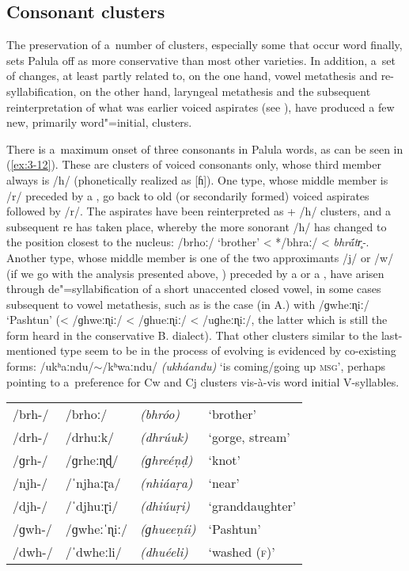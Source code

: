 \subsection{Consonant clusters}
\label{subsec:3-3-2}


The preservation of a~number of clusters, especially some that occur word finally, sets Palula off as more conservative than most other  varieties. In addition, a~set of changes, at least partly related to, on the one hand, vowel metathesis and re-syllabification, on the other hand, laryngeal metathesis and the subsequent reinterpretation of what was earlier voiced aspirates (see ), have produced a few new, primarily word"=initial, clusters.


There is a~maximum onset of three consonants in Palula words, as can be seen in (\ref{ex:3-12}). These are clusters of voiced consonants only, whose third member always is /h/ (phonetically realized as [ɦ]).  One type, whose middle member is /r/ preceded by a , go back to old (or secondarily formed) voiced aspirates followed by /r/. The aspirates have been reinterpreted as  + /h/ clusters, and a subsequent re has taken place, whereby the more sonorant /h/ has changed to the position closest to the  nucleus: /brhoː/ `brother' < */bhraː/ < \textit{bhr\'{\={a}}tr̥-}. Another type, whose middle member is one of the two approximants /j/ or /w/ (if we go with the analysis presented above, ) preceded by a  or a , have arisen through de"=syllabification of a short unaccented closed vowel, in some cases subsequent to vowel metathesis, such as is the case (in A.) with /ɡwheːɳiː/ `Pashtun' (< /ɡhweːɳiː/ < /ɡhueːɳiː/ < /uɡheːɳiː/, the latter which is still the form heard in the conservative B. dialect). That other clusters similar to the last-mentioned type seem to be in the process of evolving is evidenced by co-existing forms: /ukʰaːndu/$\sim$/kʰwaːndu/ \textit{(ukháandu)} `is coming/going up \textsc{msg}', perhaps pointing to a~preference for Cw and Cj clusters vis-à-vis word initial V-syllables. 


\begin{exe}
\extab
\label{ex:3-12}
\begin{tabular}{ l l l l }
/brh-/ &
/brhoː/ &
\textit{(bhróo)} &
`brother'\\
/drh-/ &
/drhuːk/ &
\textit{(dhrúuk)} &
`gorge, stream' \\
/ɡrh-/ &
/ɡrheːɳɖ/ &
\textit{(ɡhreéṇḍ)} &
`knot' \\
/njh-/ &
/ˈnjhaːɽa/ &
\textit{(nhiáaṛa)} &
`near'\\
/djh-/ &
/ˈdjhuːɽi/ &
\textit{(dhiúuṛi)} &
`granddaughter'\\
/ɡwh-/ &
/ɡwheːˈɳiː/ &
\textit{(ɡhueeṇíi)} &
`Pashtun'\\
/dwh-/ &
/ˈdwheːli/ &
\textit{(dhuéeli)} &
`washed (\textsc{f)}'\\
\end{tabular}
\end{exe}


